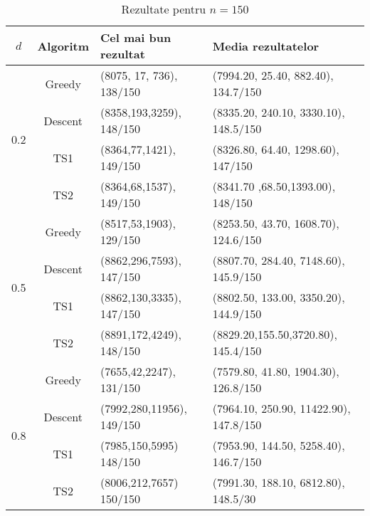 \begin{table}[H]
\centering
\caption{Rezultate pentru $n = 150$}
\begin{tabular}{ccll}
\toprule
$d$ & Algoritm & Cel mai bun rezultat  & Media rezultatelor \\
\midrule
\multirow{4}{*}{0.2}
  & Greedy  & (8075, 17, 736), 138/150 & (7994.20, 25.40, 882.40), 134.7/150 \\
  & Descent & (8358,193,3259), 148/150   & (8335.20, 240.10, 3330.10), 148.5/150 \\
  & TS1     & (8364,77,1421), 149/150    & (8326.80, 64.40, 1298.60), 147/150 \\
  & TS2     & (8364,68,1537), 149/150    & (8341.70 ,68.50,1393.00), 148/150 \\
\midrule
\multirow{4}{*}{0.5}
  & Greedy  & (8517,53,1903), 129/150     & (8253.50, 43.70, 1608.70), 124.6/150 \\
  & Descent & (8862,296,7593), 147/150    & (8807.70, 284.40, 7148.60), 145.9/150 \\
  & TS1     & (8862,130,3335), 147/150    & (8802.50, 133.00, 3350.20), 144.9/150 \\
  & TS2     & (8891,172,4249), 148/150    & (8829.20,155.50,3720.80), 145.4/150 \\
\midrule
\multirow{4}{*}{0.8}
  & Greedy  & (7655,42,2247), 131/150     & (7579.80, 41.80, 1904.30), 126.8/150 \\
  & Descent & (7992,280,11956), 149/150    & (7964.10, 250.90, 11422.90), 147.8/150 \\
  & TS1     & (7985,150,5995) 148/150     &  (7953.90, 144.50, 5258.40), 146.7/150 \\
  & TS2     &  (8006,212,7657) 150/150    &  (7991.30, 188.10, 6812.80), 148.5/30 \\
\bottomrule
\end{tabular}\label{tab:rezultate_n150}
\end{table}

